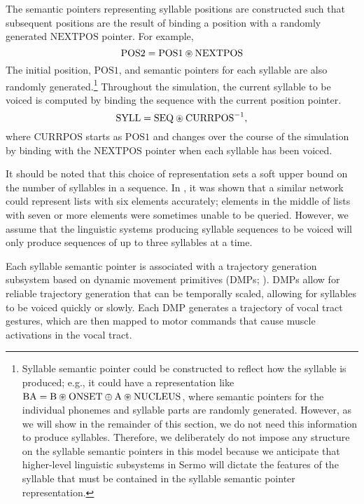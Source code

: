 The semantic pointers representing syllable positions
are constructed such that subsequent positions
are the result of binding a position with
a randomly generated $\text{NEXTPOS}$ pointer.
For example,
\begin{equation}
  \label{nextpos}
  \text{POS2} = \text{POS1} \circledast \text{NEXTPOS}
\end{equation}
The initial position, $\text{POS1}$,
and semantic pointers for each syllable
are also randomly generated.\footnote{
  Syllable semantic pointer could be constructed to
  reflect how the syllable is produced; e.g.,
  it could have a representation like
  $\text{BA} = \text{B} \circledast \text{ONSET} \oplus
    \text{A} \circledast \text{NUCLEUS}$,
  where semantic pointers for the individual phonemes
  and syllable parts are randomly generated.
  However,
  as we will show in the remainder of this section,
  we do not need this information to
  produce syllables.
  Therefore, we deliberately do not impose
  any structure on the syllable semantic pointers
  in this model because we anticipate
  that higher-level linguistic subsystems in Sermo
  will dictate the features of the syllable
  that must be contained
  in the syllable semantic pointer representation.}
Throughout the simulation,
the current syllable to be voiced
is computed by binding the sequence
with the current position pointer.
\begin{equation}
  \text{SYLL} = \text{SEQ} \circledast \text{CURRPOS}^{-1},
\end{equation}
where $\text{CURRPOS}$ starts as $\text{POS1}$
and changes over the course of the simulation
by binding with the $\text{NEXTPOS}$ pointer
when each syllable has been voiced.

It should be noted that
this choice of representation
sets a soft upper bound
on the number of syllables in a sequence.
In \citet{eliasmith2012},
it was shown that a similar network
could represent lists with six elements accurately;
elements in the middle of
lists with seven or more elements
were sometimes unable to be queried.
However, we assume that the
linguistic systems producing
syllable sequences to be voiced
will only produce sequences
of up to three syllables
at a time.

Each syllable semantic pointer
is associated with a
trajectory generation subsystem
based on dynamic movement primitives
(DMPs; \citealp{schaal2006,dewolf2015}).
DMPs allow for reliable trajectory generation
that can be temporally scaled,
allowing for syllables to be voiced
quickly or slowly.
Each DMP generates a trajectory
of vocal tract gestures,
which are then mapped to
motor commands that cause
muscle activations in the vocal tract.

